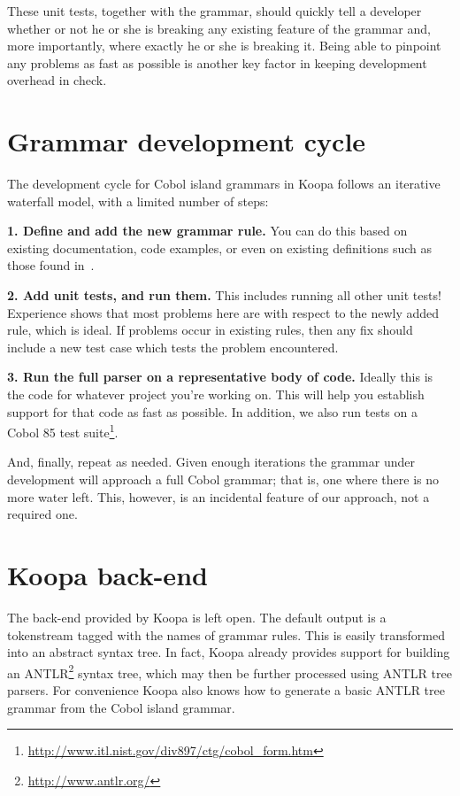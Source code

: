\documentclass[a4paper]{article}
\begin{document}
These unit tests, together with the grammar, should quickly tell a developer whether or not he or she is breaking any existing feature of the grammar and, more importantly, where exactly he or she is breaking it. Being able to pinpoint any problems as fast as possible is another key factor in keeping development overhead in check.


\section{Grammar development cycle}
\label{development-cycle}

The development cycle for Cobol island grammars in Koopa follows an iterative waterfall model, with a limited number of steps:

\textbf{1. Define and add the new grammar rule.} You can do this based on existing documentation, code examples, or even on existing definitions such as those found in~\cite{LV01-SPE}.

\textbf{2. Add unit tests, and run them.} This includes running all other unit tests! Experience shows that most problems here are with respect to the newly added rule, which is ideal. If problems occur in existing rules, then any fix should include a new test case which tests the problem encountered.

\textbf{3. Run the full parser on a representative body of code.} Ideally this is the code for whatever project you're working on. This will help you establish support for that code as fast as possible. In addition, we also run tests on a Cobol 85 test suite\footnote{\scriptsize\url{http://www.itl.nist.gov/div897/ctg/cobol_form.htm}}.

And, finally, repeat as needed. Given enough iterations the grammar under development will approach a full Cobol grammar; that is, one where there is no more water left. This, however, is an incidental feature of our approach, not a required one.


\section{Koopa back-end}
\label{backend}

The back-end provided by Koopa is left open. The default output is a tokenstream tagged with the names of grammar rules. This is easily transformed into an abstract syntax tree. In fact, Koopa already provides support for building an ANTLR\footnote{\scriptsize\url{http://www.antlr.org/}} syntax tree, which may then be further processed using ANTLR tree parsers. For convenience Koopa also knows how to generate a basic ANTLR tree grammar from the Cobol island grammar.
\end{document}
